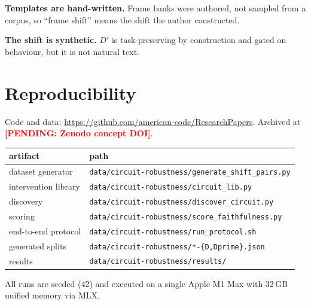 \documentclass[11pt,a4paper]{article}
\newcounter{pendingcount}
\DeclareRobustCommand{\pending}[1]{\stepcounter{pendingcount}%
  \textcolor{red}{\textbf{[PENDING: #1]}}}
\begin{document}
\textbf{Templates are hand-written.} Frame banks were authored, not sampled from a
corpus, so ``frame shift'' means the shift the author constructed.

\textbf{The shift is synthetic.} $D'$ is task-preserving by construction and gated on
behaviour, but it is not natural text.

\section{Reproducibility}
\label{sec:repro}

Code and data: \url{https://github.com/american-code/ResearchPapers}. Archived at
\pending{Zenodo concept DOI}.

\begin{center}
\begin{tabular}{ll}
\toprule
artifact & path \\
\midrule
dataset generator      & \texttt{data/circuit-robustness/generate\_shift\_pairs.py} \\
intervention library   & \texttt{data/circuit-robustness/circuit\_lib.py} \\
discovery              & \texttt{data/circuit-robustness/discover\_circuit.py} \\
scoring                & \texttt{data/circuit-robustness/score\_faithfulness.py} \\
end-to-end protocol    & \texttt{data/circuit-robustness/run\_protocol.sh} \\
generated splits       & \texttt{data/circuit-robustness/*-\{D,Dprime\}.json} \\
results                & \texttt{data/circuit-robustness/results/} \\
\bottomrule
\end{tabular}
\end{center}

All runs are seeded (42) and executed on a single Apple M1 Max with 32\,GB unified
memory via MLX.



\end{document}
